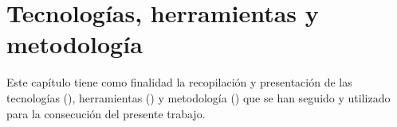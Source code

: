 \chapter{Tecnologías, herramientas y metodología}
\label{cap:tecnolHerramMetodo}
Este capítulo tiene como finalidad la recopilación y presentación de las tecnologías (), herramientas () y metodología ()
que se han seguido y utilizado para la consecución del presente trabajo.



